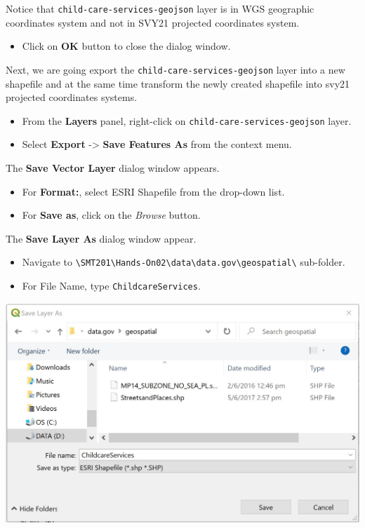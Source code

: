 \documentclass[
  letterpaper,
  DIV=11,
  numbers=noendperiod]{scrreprt}
\providecommand{\tightlist}{%
  \setlength{\itemsep}{0pt}\setlength{\parskip}{0pt}}\usepackage{longtable,booktabs,array}
\begin{document}
Notice that \texttt{child-care-services-geojson} layer is in WGS
geographic coordinates system and not in SVY21 projected coordinates
system.

\begin{itemize}
\tightlist
\item
  Click on \textbf{OK} button to close the dialog window.
\end{itemize}

Next, we are going export the \texttt{child-care-services-geojson} layer
into a new shapefile and at the same time transform the newly created
shapefile into svy21 projected coordinates systems.

\begin{itemize}
\tightlist
\item
  From the \textbf{Layers} panel, right-click on
  \texttt{child-care-services-geojson} layer.
\item
  Select \textbf{Export} -\textgreater{} \textbf{Save Features As} from
  the context menu.
\end{itemize}

The \textbf{Save Vector Layer} dialog window appears.

\begin{itemize}
\tightlist
\item
  For \textbf{Format:}, select ESRI Shapefile from the drop-down list.
\item
  For \textbf{Save as}, click on the \emph{Browse} button.
\end{itemize}

The \textbf{Save Layer As} dialog window appear.

\begin{itemize}
\tightlist
\item
  Navigate to
  \texttt{\textbackslash{}SMT201\textbackslash{}Hands-On02\textbackslash{}data\textbackslash{}data.gov\textbackslash{}geospatial\textbackslash{}}
  sub-folder.
\item
  For File Name, type \texttt{ChildcareServices}.
\end{itemize}

\includegraphics{./img02/image13.jpg}
\end{document}
